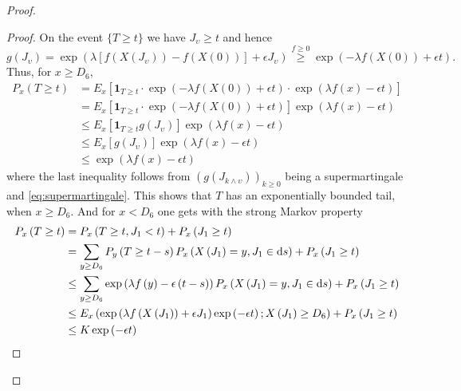 \documentclass[12pt,a4paper]{scrartcl}
\numberwithin{equation}{section}
\begin{document}
\begin{proof}
\begin{proof}
On the event $\lbrace T \geq t \rbrace$ we have $ J_{\upsilon} \geq t $ and hence
$$ g\left( J_{\upsilon} \right) = \exp\left( \lambda \left[f\left(X\left(J_{\upsilon} \right) \right) - f\left(X\left(0\right) \right) \right] + \epsilon J_{\upsilon}\right) \overset{f \geq 0}{\geq} \exp\left(-\lambda f\left(X\left(0\right) \right)  + \epsilon t \right).$$
Thus, for $x \geq D_6$,
\begin{align*}
P_x\left(T \geq t \right) &= E_x\left[\textbf{1}_{T \geq t} \cdot \exp\left(-\lambda f\left(X\left(0\right) \right) + \epsilon t \right) \cdot \exp\left(\lambda f\left(x\right) - \epsilon t \right) \right] \\
&= E_x\left[\textbf{1}_{T \geq t} \cdot \exp\left(-\lambda f\left(X\left(0\right) \right) + \epsilon t \right) \right] \exp\left(\lambda f\left(x\right) - \epsilon t \right) \\
&\leq E_x\left[\textbf{1}_{T \geq t}  g\left(J_{\upsilon} \right) \right] \exp\left(\lambda f\left(x\right) - \epsilon t \right) \\
&\leq E_x\left[g\left(J_{\upsilon} \right) \right] \exp\left(\lambda f\left(x\right) - \epsilon t \right) \\
&\leq \exp\left(\lambda f\left(x\right) - \epsilon t \right)
\end{align*}
where the last inequality follows from $\left(g\left(J_{k \wedge \upsilon} \right)\right)_{ k \geq 0}$ being a supermartingale and 
\eqref{eq:supermartingale}. This shows that $T$ has an exponentially bounded tail, when $x \geq D_6.$
And for $x < D_6$ one gets with the strong Markov property
\begin{align*}
P_x\left(T \geq t \right) &= P_x\left(T \geq t, J_1 < t \right) + P_x\left(J_1 \geq t \right) \\
&= \sum_{y \geq D_6} P_y\left(T \geq t - s \right) P_x\left(X\left(J_1 \right) = y , J_1 \in \textnormal{d}s \right) + P_x\left(J_1 \geq t \right)\\
&\leq \sum_{y \geq D_6 } \exp\left( \lambda f\left(y\right) - \epsilon \left(t-s\right) \right) P_x\left(X\left(J_1 \right) = y , J_1 \in \textnormal{d}s \right) + P_x\left(J_1 \geq t \right)\\
&\leq E_x\left(\exp\left(\lambda f\left(X\left(J_1\right) \right) + \epsilon J_1 \right) \exp\left(-\epsilon t \right); X\left(J_1\right) \geq D_6 \right) + P_x\left(J_1 \geq t \right) \\
&\leq K \exp\left(-\epsilon t \right)
\end{align*}


\end{proof}
\end{proof}
\end{document}
